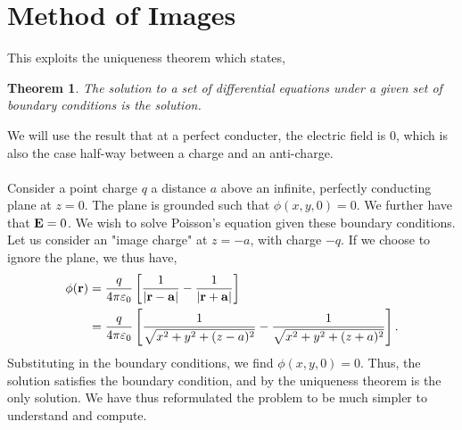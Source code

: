 \documentclass{book}
\newtheorem*{theorem}{Theorem}
\begin{document}
\section{Method of Images}
This exploits the uniqueness theorem which states,
\begin{theorem}
	The solution to a set of differential equations under a given set of boundary conditions is the solution.
\end{theorem}
We will use the result that at a perfect conducter, the electric field is 0, which is also the case half-way between a charge and an anti-charge.
\\\\
Consider a point charge $q$ a distance $a$ above an infinite, perfectly conducting plane at $z = 0$. The plane is grounded such that $\phi(x,y,0) = 0$. We further have that $\vb{E} = 0$. We wish to solve Poisson's equation given these boundary conditions. Let us consider an "image charge" at $z = -a$, with charge $-q$. If we choose to ignore the plane, we thus have,
\begin{equation}
	\begin{split}
	\phi(\vb{r}) & = \frac{q}{4\pi\varepsilon_0}\left[\frac{1}{|\vb{r}-\vb{a}|} - \frac{1}{|\vb{r} + \vb{a}|}\right] \\
	& = \frac{q}{4\pi\varepsilon_0} \left[\frac{1}{\sqrt{x^2 + y^2 + (z-a)^2}}- \frac{1}{\sqrt{x^2 + y^2 + (z+a)^2}}\right].
	\end{split}
\end{equation} 
Substituting in the boundary conditions, we find $\phi(x,y,0) = 0$. Thus, the solution satisfies the boundary condition, and by the uniqueness theorem is the only solution. We have thus reformulated the problem to be much simpler to understand and compute.
\end{document}
